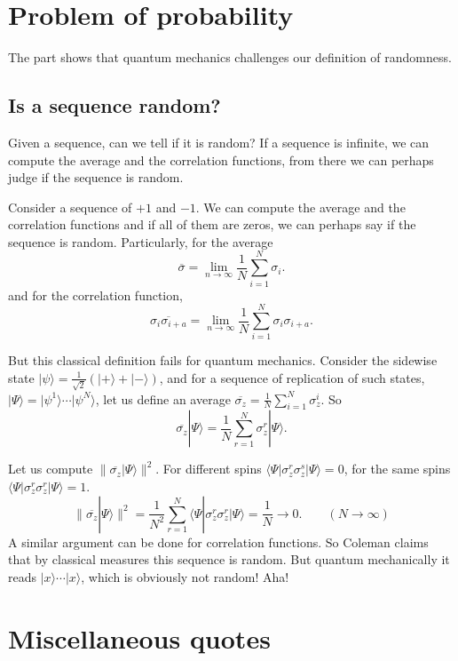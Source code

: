 \documentclass{article}
\begin{document}
\section{Problem of probability}


The part shows that quantum mechanics challenges our definition of randomness.

\subsection{Is a sequence random?}

Given a sequence, can we tell if it is random?
If a sequence is infinite,
we can compute the average and the correlation functions,
from there we can perhaps judge if the sequence is random.

Consider a sequence of $+1$ and $-1$.
We can compute the average and the correlation functions
and if all of them are zeros,
we can perhaps say if the sequence is random.
Particularly, for the average
$$
\overline{ \sigma } = \lim_{n \rightarrow \infty} \frac{1}{N} \sum_{i = 1}^N \sigma_i.
$$
and for the correlation function,
$$
\overline{ \sigma_i \sigma_{i+a} } = \lim_{n \rightarrow \infty} \frac{1}{N} \sum_{i = 1}^N \sigma_i \sigma_{i+a}.
$$

But this classical definition fails for quantum mechanics.
Consider the sidewise state
$|\psi\rangle = \frac{1}{\sqrt 2}(|+\rangle + |-\rangle)$,
and for a sequence of replication of such states,
$|\Psi\rangle = |\psi^1\rangle \cdots |\psi^N\rangle$,
let us define an average $\overline{ \sigma_z } = \frac{1}{N} \sum_{i = 1}^N \sigma^i_z$.
So
$$
\overline{ \sigma_z } |\Psi\rangle
= \frac{1}{N} \sum_{r=1}^N \sigma^r_z |\Psi\rangle.
$$

Let us compute $\|\overline{ \sigma_z } |\Psi\rangle \|^2$.
For different spins $\langle \Psi|\sigma^r_z \sigma^s_z | \Psi \rangle = 0$,
for the same spins $\langle \Psi|\sigma^r_z \sigma^r_z | \Psi \rangle = 1$.
$$
\|\overline{ \sigma_z } |\Psi\rangle \|^2
=
\frac{1}{N^2} \sum_{r = 1}^N \langle \Psi|\sigma^r_z \sigma^r_z | \Psi \rangle = \frac{1}{N}
 \rightarrow 0. \qquad (N\rightarrow \infty)
$$
A similar argument can be done for correlation functions.
So Coleman claims that by classical measures this sequence is random.
But quantum mechanically it reads $|x \rangle \cdots |x\rangle$,
which is obviously not random! Aha!


\section{Miscellaneous quotes}
\end{document}
